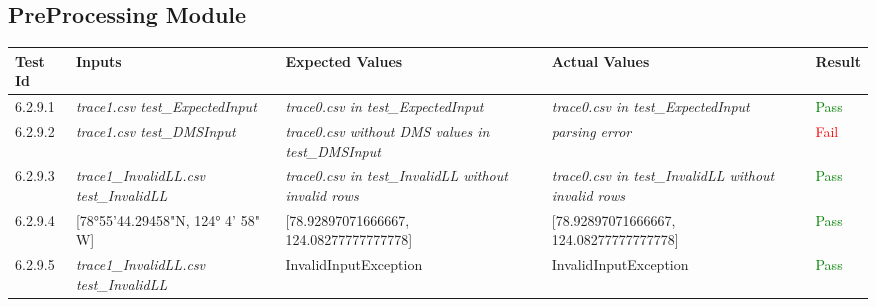 \documentclass[12pt, titlepage]{article}
\begin{document}
\subsection{PreProcessing Module}
\begin{tabular}{ | m{3.5em} | m{4cm}| m{4cm} | m{4cm} | m{1.2cm} | } 
  \hline
  \textbf{Test Id}& \textbf{Inputs} & \textbf{Expected Values} & \textbf{Actual Values} & \textbf{Result} \\ 
  \hline
  6.2.9.1 & \textit{trace1.csv test\_ExpectedInput} & \textit{trace0.csv in test\_ExpectedInput} & \textit{trace0.csv in test\_ExpectedInput} & \textcolor{green}{Pass} \\ 
  \hline
  6.2.9.2 & \textit{trace1.csv test\_DMSInput} & \textit{trace0.csv without DMS values in test\_DMSInput} & \textit{parsing error} & \textcolor{red}{Fail} \\ 
  \hline
   6.2.9.3 & \textit{trace1\_InvalidLL.csv test\_InvalidLL} & \textit{trace0.csv in test\_InvalidLL without invalid rows} & \textit{trace0.csv in test\_InvalidLL without invalid rows} & \textcolor{green}{Pass} \\ 
  \hline 
   6.2.9.4 & [78°55'44.29458"N, 124° 4' 58" W] & [78.92897071666667, 124.08277777777778] & [78.92897071666667, 124.08277777777778] & \textcolor{green}{Pass} \\ 
   \hline
   6.2.9.5 & \textit{trace1\_InvalidLL.csv test\_InvalidLL} & InvalidInputException & InvalidInputException & \textcolor{green}{Pass} \\ 
   \hline
\end{tabular}
\end{document}
